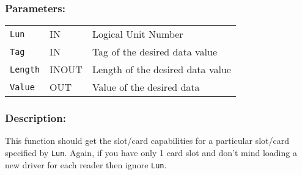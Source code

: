 \documentclass[a4paper,12pt]{article}
\newcommand{\parameters}{\subsubsection{Parameters:}}
\newcommand{\desc}{\subsubsection{Description:}}
\begin{document}
\parameters

\begin{tabular}{lll}
\texttt{Lun} & IN & Logical Unit Number \\
\texttt{Tag} & IN & Tag of the desired data value \\
\texttt{Length} & INOUT & Length of the desired data value \\
\texttt{Value} & OUT & Value of the desired data \\
\end{tabular}

\desc

This function should get the slot/card capabilities for a particular
slot/card specified by \texttt{Lun}. Again, if you have only 1 card slot
and don't mind loading a new driver for each reader then ignore
\texttt{Lun}.
\end{document}
